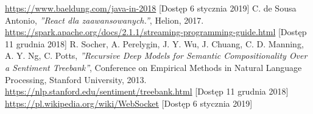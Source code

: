 \begin{thebibliography}{99}
		\bibitem{[20]}
		\url{https://www.baeldung.com/java-in-2018} [Dostęp 6 stycznia 2019]
		\bibitem{[21]}
		C. de Sousa Antonio, \textit{''React dla zaawansowanych.''}, Helion, 2017.
		\bibitem{[22]}
		\url{https://spark.apache.org/docs/2.1.1/streaming-programming-guide.html} [Dostęp 11 grudnia 2018]
		\bibitem{[23]}
		R. Socher, A. Perelygin, J. Y. Wu, J. Chuang, C. D. Manning, A. Y. Ng, C. Potts, \textit{''Recursive Deep Models for Semantic Compositionality Over a Sentiment Treebank''}, Conference on Empirical Methods in Natural Language Processing, Stanford University, 2013.
		\bibitem{[24]}
		\url{https://nlp.stanford.edu/sentiment/treebank.html} [Dostęp 11 grudnia 2018]
		\bibitem{[25]}
		\url{https://pl.wikipedia.org/wiki/WebSocket} [Dostęp 6 stycznia 2019]

\end{thebibliography}
